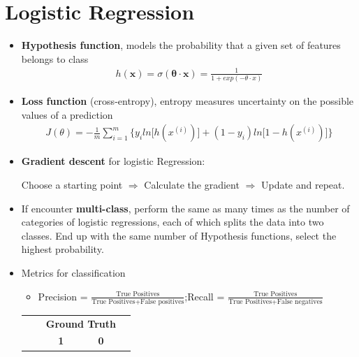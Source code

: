 \documentclass[a4paper,10pt]{article}
\begin{document}
\section{Logistic Regression}
\begin{itemize}
    \item \textbf{Hypothesis function}, models the probability that a given set of features belongs
    to class
        \begin{gather*}
            h(\mathbf{x}) = \sigma(\mathbf{\theta\cdot x}) = \frac{1}{1+exp(-\theta\cdot x)}
        \end{gather*}
    \item \textbf{Loss function} (cross-entropy), entropy measures uncertainty on the possible values of a prediction
        \begin{gather*}
            J(\theta) = -\frac{1}{m}\sum_{i=1}^{m}\Big\{y_i ln\Big[h(x^{(i)})\Big] + (1-y_i)ln\Big[1-h(x^{(i)})\Big]\Big\}
        \end{gather*}
    \item \textbf{Gradient descent} for logistic Regression:\par
    Choose a starting point $\Rightarrow$ Calculate the gradient $\Rightarrow$ Update and repeat. 
    \item If encounter \textbf{multi-class}, perform the same as many times as the number of categories of logistic regressions, each of which splits the data into two classes. End up with the same number of Hypothesis functions, select the highest probability.
    \item Metrics for classification
        \begin{itemize}
            \item Precision = $\frac{\text{True Positives}}{\text{True Positives+False positives}}$;\hspace*{0.5cm}Recall = $\frac{\text{True Positives}}{\text{True Positives+False negatives}}$
        \end{itemize}
        \begin{table}[hbt]
            \centering
            \begin{tabular}{lcccl}
            \cline{3-4}
                                & \multicolumn{1}{l|}{}           & \multicolumn{2}{c|}{\textbf{Ground Truth}}                               &  \\ \cline{3-4}
                                & \multicolumn{1}{c|}{}           & \multicolumn{1}{c|}{\textbf{1}}     & \multicolumn{1}{c|}{\textbf{0}}    &  \\ \cline{1-4}

\end{tabular}
\end{table}
\end{itemize}
\end{document}
